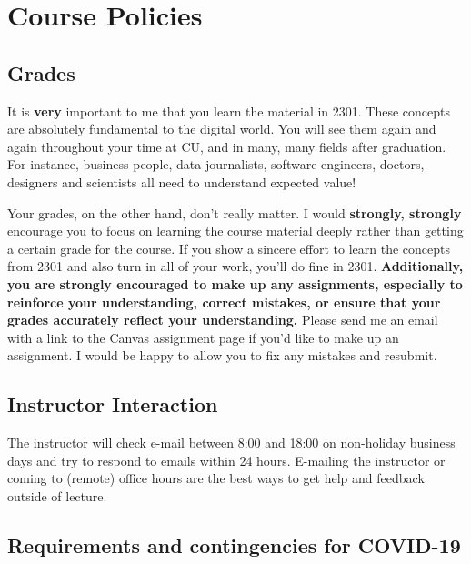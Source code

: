 \documentclass[10pt]{memoir}
\begin{document}
\clearpage

\section{\textbf{Course Policies}}


\subsection{Grades}
It is \textbf{very} important to me that you learn the material in 2301. These concepts are absolutely fundamental to the digital world. You will see them again and again throughout your time at CU, and in many, many fields after graduation. For instance, business people, data journalists, software engineers, doctors, designers and scientists all need to understand expected value! 

Your grades, on the other hand, don't really matter. I would \textbf{strongly, strongly} encourage you to focus on learning the course material deeply rather than getting a certain grade for the course. If you show a sincere effort to learn the concepts from 2301 and also turn in all of your work, you'll do fine in 2301. \textbf{Additionally, you are strongly encouraged to make up any assignments, especially to reinforce your understanding, correct mistakes, or ensure that your grades accurately reflect your understanding.} Please send me an email with a link to the Canvas assignment page if you'd like to make up an assignment. I would be happy to allow you to fix any mistakes and resubmit.

\subsection{Instructor Interaction}
The instructor will check e-mail between 8:00 and 18:00 on non-holiday business days and try to respond to emails within 24 hours. E-mailing the instructor or coming to (remote) office hours are the best ways to get help and feedback outside of lecture.


\subsection{Requirements and contingencies for COVID-19}
\end{document}
